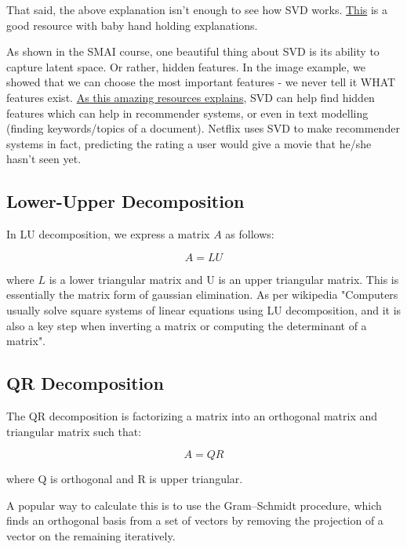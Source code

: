 That said, the above explanation isn't enough to see how SVD works. \href{http://www.ams.org/publicoutreach/feature-column/fcarc-svd}{This} is a good resource with baby hand holding explanations.

As shown in the SMAI course, one beautiful thing about SVD is its ability to capture latent space. Or rather, hidden features. In the image example, we showed that we can choose the most important features - we never tell it WHAT features exist. \href{https://sifter.org/~simon/journal/20061211.html}{As this amazing resources explains}, SVD can help find hidden features which can help in recommender systems, or even in text modelling (finding keywords/topics of a document). Netflix uses SVD to make recommender systems in fact, predicting the rating a user would give a movie that he/she hasn't seen yet.

\subsection{Lower-Upper Decomposition}

In LU decomposition, we express a matrix $A$ as follows:

\begin{equation}
    A = LU
\end{equation}

where $L$ is a lower triangular matrix and U is an upper triangular matrix. This is essentially the matrix form of gaussian elimination. As per wikipedia "Computers usually solve square systems of linear equations using LU decomposition, and it is also a key step when inverting a matrix or computing the determinant of a matrix".

\subsection{QR Decomposition}

The QR decomposition is factorizing a matrix into an orthogonal matrix and triangular matrix such that:

\begin{equation}
    A = QR
\end{equation}

where Q is orthogonal and R is upper triangular.

A popular way to calculate this is to use the  Gram–Schmidt procedure, which finds an orthogonal basis from a set of vectors by removing the projection of a vector on the remaining iteratively.

